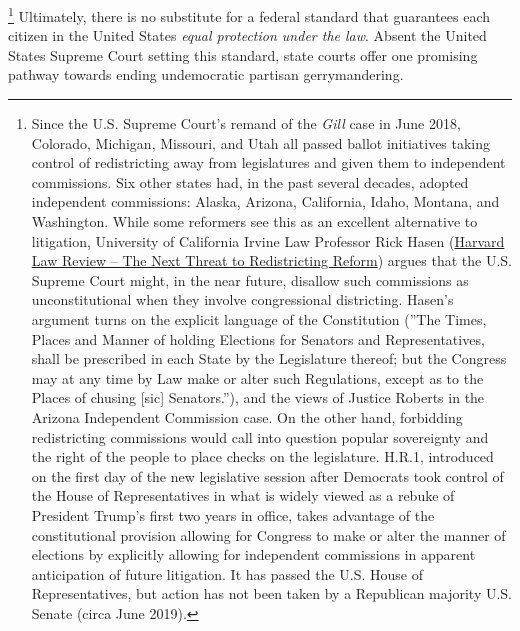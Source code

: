         \footnote{Since the U.S. Supreme Court's remand of the \textit{Gill} case in June 2018, Colorado, Michigan, Missouri, and Utah all passed ballot initiatives taking control of redistricting away from legislatures and given them to independent commissions. Six other states had, in the past several decades, adopted independent commissions: Alaska, Arizona, California, Idaho, Montana, and Washington. While some reformers see this as an excellent alternative to litigation, University of California Irvine Law Professor Rick Hasen (\href{https://blog.harvardlawreview.org/the-next-threat-to-redistricting-reform/}{Harvard Law Review -- The Next Threat to Redistricting Reform}) argues that the U.S. Supreme Court might, in the near future, disallow such commissions as unconstitutional when they involve congressional districting. Hasen's argument turns on the explicit language of the Constitution (''The Times, Places and Manner of holding Elections for Senators and Representatives, shall be prescribed in each State by the Legislature thereof; but the Congress may at any time by Law make or alter such Regulations, except as to the Places of chusing [sic] Senators.''), and the views of Justice Roberts in the Arizona Independent Commission case. On the other hand, forbidding redistricting commissions would call into question popular sovereignty and the right of the people to place checks on the legislature. H.R.1, introduced on the first day of the new legislative session after Democrats took control of the House of Representatives in what is widely viewed as a rebuke of President Trump's first two years in office, takes advantage of the constitutional provision allowing for Congress to make or alter the manner of elections by explicitly allowing for independent commissions in apparent anticipation of future litigation. It has passed the U.S. House of Representatives, but action has not been taken by a Republican majority U.S. Senate (circa June 2019).}
    Ultimately, there is no substitute for a federal standard that guarantees each citizen in the United States \textit{equal protection under the law}. Absent the United States Supreme Court setting this standard, state courts offer one promising pathway towards ending undemocratic partisan gerrymandering.
